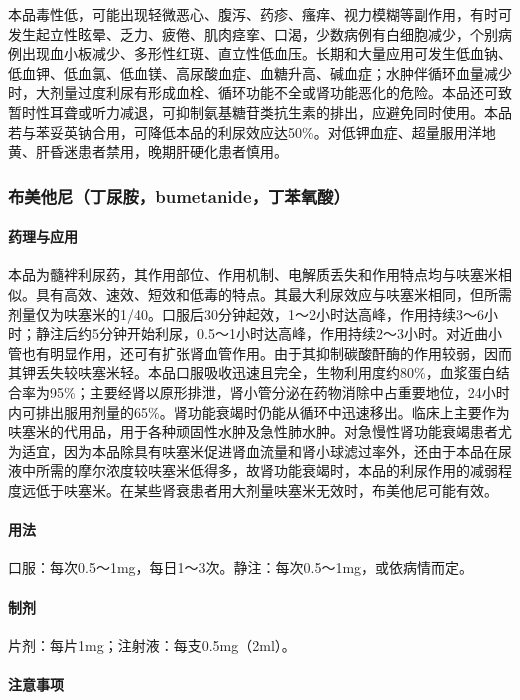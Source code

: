 本品毒性低，可能出现轻微恶心、腹泻、药疹、瘙痒、视力模糊等副作用，有时可发生起立性眩晕、乏力、疲倦、肌肉痉挛、口渴，少数病例有白细胞减少，个别病例出现血小板减少、多形性红斑、直立性低血压。长期和大量应用可发生低血钠、低血钾、低血氯、低血镁、高尿酸血症、血糖升高、碱血症；水肿伴循环血量减少时，大剂量过度利尿有形成血栓、循环功能不全或肾功能恶化的危险。本品还可致暂时性耳聋或听力减退，可抑制氨基糖苷类抗生素的排出，应避免同时使用。本品若与苯妥英钠合用，可降低本品的利尿效应达50\%。对低钾血症、超量服用洋地黄、肝昏迷患者禁用，晚期肝硬化患者慎用。

\subsubsection{布美他尼（丁尿胺，bumetanide，丁苯氧酸）}

\paragraph{药理与应用}

本品为髓袢利尿药，其作用部位、作用机制、电解质丢失和作用特点均与呋塞米相似。具有高效、速效、短效和低毒的特点。其最大利尿效应与呋塞米相同，但所需剂量仅为呋塞米的1/40。口服后30分钟起效，1～2小时达高峰，作用持续3～6小时；静注后约5分钟开始利尿，0.5～1小时达高峰，作用持续2～3小时。对近曲小管也有明显作用，还可有扩张肾血管作用。由于其抑制碳酸酐酶的作用较弱，因而其钾丢失较呋塞米轻。本品口服吸收迅速且完全，生物利用度约80\%，血浆蛋白结合率为95\%；主要经肾以原形排泄，肾小管分泌在药物消除中占重要地位，24小时内可排出服用剂量的65\%。肾功能衰竭时仍能从循环中迅速移出。临床上主要作为呋塞米的代用品，用于各种顽固性水肿及急性肺水肿。对急慢性肾功能衰竭患者尤为适宜，因为本品除具有呋塞米促进肾血流量和肾小球滤过率外，还由于本品在尿液中所需的摩尔浓度较呋塞米低得多，故肾功能衰竭时，本品的利尿作用的减弱程度远低于呋塞米。在某些肾衰患者用大剂量呋塞米无效时，布美他尼可能有效。

\paragraph{用法}

口服：每次0.5～1mg，每日1～3次。静注：每次0.5～1mg，或依病情而定。

\paragraph{制剂}

片剂：每片1mg；注射液：每支0.5mg（2ml）。

\paragraph{注意事项}

